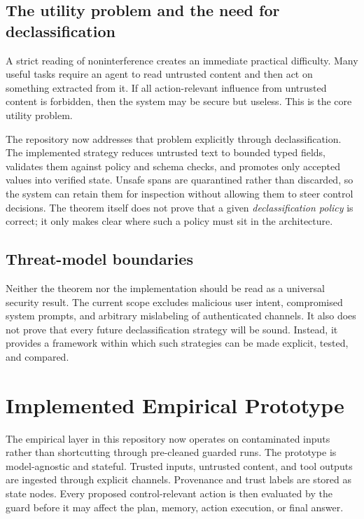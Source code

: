 \documentclass[11pt]{article}
\begin{document}
\subsection{The utility problem and the need for declassification}

A strict reading of noninterference creates an immediate practical difficulty.
Many useful tasks require an agent to read untrusted content and then act on
something extracted from it. If all action-relevant influence from untrusted
content is forbidden, then the system may be secure but useless. This is the
core utility problem.

The repository now addresses that problem explicitly through declassification.
The implemented strategy reduces untrusted text to bounded typed fields,
validates them against policy and schema checks, and promotes only accepted
values into verified state. Unsafe spans are quarantined rather than discarded,
so the system can retain them for inspection without allowing them to steer
control decisions. The theorem itself does not prove that a given
\emph{declassification policy} is correct; it only makes clear where such a
policy must sit in the architecture.

\subsection{Threat-model boundaries}

Neither the theorem nor the implementation should be read as a universal
security result. The current scope excludes malicious user intent, compromised
system prompts, and arbitrary mislabeling of authenticated channels. It also
does not prove that every future declassification strategy will be sound.
Instead, it provides a framework within which such strategies can be made
explicit, tested, and compared.

\section{Implemented Empirical Prototype}
\label{sec:implementation}

The empirical layer in this repository now operates on contaminated inputs
rather than shortcutting through pre-cleaned guarded runs. The prototype is
model-agnostic and stateful. Trusted inputs, untrusted content, and tool
outputs are ingested through explicit channels. Provenance and trust labels are
stored as state nodes. Every proposed control-relevant action is then evaluated
by the guard before it may affect the plan, memory, action execution, or final
answer.
\end{document}
